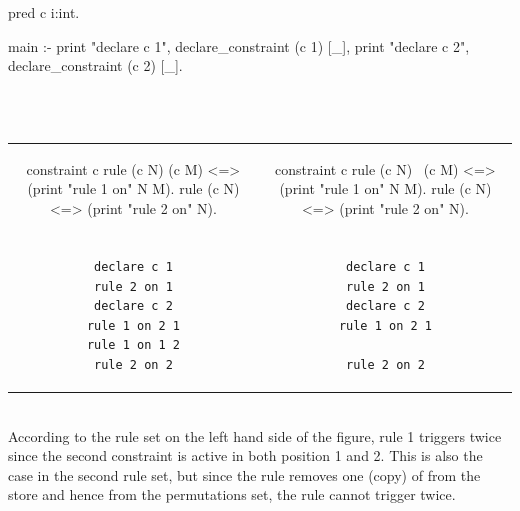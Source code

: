 \documentclass[a4paper, 11pt]{book}
\begin{document}
\begin{center}\begin{minipage}{.6\textwidth}
\begin{elpicodelj}
pred c i:int.

main :-
  print "declare c 1",
  declare_constraint (c 1) [_],
  print "declare c 2",
  declare_constraint (c 2) [_].
\end{elpicodelj}
\end{minipage}
~\\
\vspace{1em}
~\\
\bgroup
\setlength{\tabcolsep}{1em}
\begin{tabular}{c c}
\begin{minipage}{.44\textwidth}
\begin{elpicodelj}
constraint c {
  rule (c N) (c M) <=>
    (print "rule 1 on" N M).
  rule (c N) <=>
    (print "rule 2 on" N).
}
\end{elpicodelj}
\end{minipage} &
\begin{minipage}{.44\textwidth}
\begin{elpicodelj}
constraint c {
  rule (c N) \ (c M) <=>
    (print "rule 1 on" N M).
  rule (c N) <=>
    (print "rule 2 on" N).
}
\end{elpicodelj}
\end{minipage} \\
\\
\vspace{1em}
\begin{minipage}{.44\textwidth}
\begin{verbatim}
declare c 1
rule 2 on 1
declare c 2
rule 1 on 2 1
rule 1 on 1 2
rule 2 on 2
\end{verbatim}
\end{minipage} &
\begin{minipage}{.44\textwidth}
\begin{verbatim}
declare c 1
rule 2 on 1
declare c 2
rule 1 on 2 1

rule 2 on 2
\end{verbatim}
\end{minipage}
\end{tabular}
\egroup
\end{center}
~\\

According to the rule set on the left hand side of the figure,
rule 1 triggers twice since the second  constraint
is active in both position 1 and 2. This is also the case
in the second rule set, but since the rule removes one (copy) of
 from the store and hence from the permutations set,
the rule cannot trigger twice.
\end{document}
